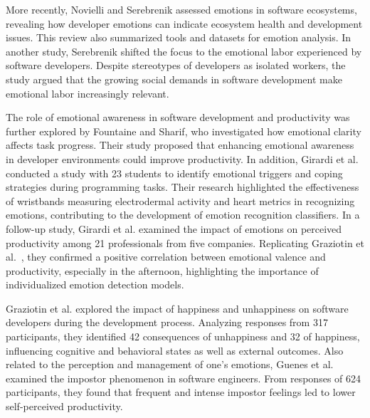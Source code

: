 More recently, Novielli and Serebrenik \cite{novielli2023emotion} assessed emotions in software ecosystems, revealing how developer emotions can indicate ecosystem health and development issues. This review also summarized tools and datasets for emotion analysis. In another study, Serebrenik \cite{serebrenik2017emotional} shifted the focus to the emotional labor experienced by software developers. Despite stereotypes of developers as isolated workers, the study argued that the growing social demands in software development make emotional labor increasingly relevant. 

The role of emotional awareness in software development and productivity was further explored by Fountaine and Sharif\cite{fountaine2017emotional}, who investigated how emotional clarity affects task progress. Their study proposed that enhancing emotional awareness in developer environments could improve productivity. In addition, Girardi et al. \cite{girardi2020recognizing} conducted a study with 23 students to identify emotional triggers and coping strategies during programming tasks. Their research highlighted the effectiveness of wristbands measuring electrodermal activity and heart metrics in recognizing emotions, contributing to the development of emotion recognition classifiers. In a follow-up study, Girardi et al. \cite{girardi2021emotions} examined the impact of emotions on perceived productivity among 21 professionals from five companies. Replicating Graziotin et al.~\cite{graziotin2015}, they confirmed a positive correlation between emotional valence and productivity, especially in the afternoon, highlighting the importance of individualized emotion detection models.



Graziotin et al. \cite{graziotin2018happens} explored the impact of happiness and unhappiness on software developers during the development process. Analyzing responses from 317 participants, they identified 42 consequences of unhappiness and 32 of happiness, influencing cognitive and behavioral states as well as external outcomes. Also related to the perception and management of one's emotions, Guenes et al. \cite{guenes2024impostor} examined the impostor phenomenon in software engineers. From responses of 624 participants, they found that frequent and intense impostor feelings led to lower self-perceived productivity.

